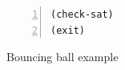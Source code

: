 \begin{figure}
\begin{Verbatim}[fontfamily=courier, frame=single, framesep=1mm,
  numbers=left, fontsize=\scriptsize]
(check-sat)
(exit)
\end{Verbatim}
  \caption{Bouncing ball example}
  \label{fig:bouncing-ball}
\end{figure}

